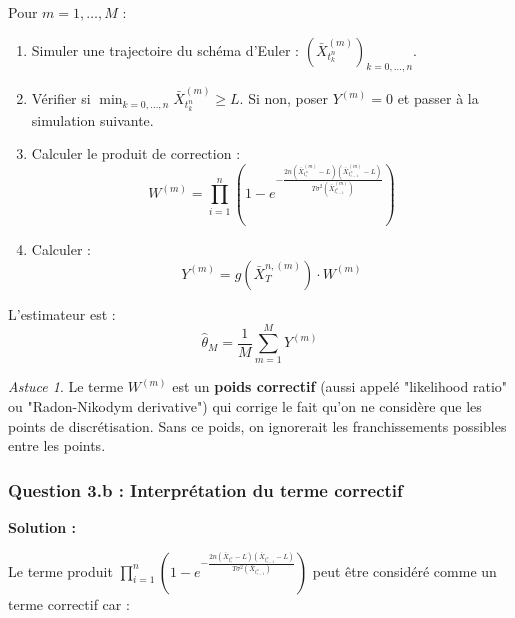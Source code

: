 \documentclass[12pt,a4paper]{article}
\theoremstyle{definition}
\theoremstyle{remark}
\newtheorem*{astuce}{Astuce}
\begin{document}
Pour $m = 1, \ldots, M$ :
\begin{enumerate}
\item Simuler une trajectoire du schéma d'Euler : $(\bar{X}_{t_k^n}^{(m)})_{k=0,\ldots,n}$.

\item Vérifier si $\min_{k=0,\ldots,n} \bar{X}_{t_k^n}^{(m)} \geq L$. Si non, poser $Y^{(m)} = 0$ et passer à la simulation suivante.

\item Calculer le produit de correction :
\[
W^{(m)} = \prod_{i=1}^n \left(1 - e^{-\frac{2n(\bar{X}_{t_i^n}^{(m)}-L)(\bar{X}_{t_{i-1}^n}^{(m)}-L)}{T\sigma^2(\bar{X}_{t_{i-1}^n}^{(m)})}}\right)
\]

\item Calculer :
\[
Y^{(m)} = g(\bar{X}_T^{n,(m)}) \cdot W^{(m)}
\]
\end{enumerate}

L'estimateur est :
\[
\hat{\theta}_M = \frac{1}{M}\sum_{m=1}^M Y^{(m)}
\]

\begin{astuce}
Le terme $W^{(m)}$ est un \textbf{poids correctif} (aussi appelé "likelihood ratio" ou "Radon-Nikodym derivative") qui corrige le fait qu'on ne considère que les points de discrétisation. Sans ce poids, on ignorerait les franchissements possibles entre les points.
\end{astuce}

\subsubsection{Question 3.b : Interprétation du terme correctif}

\textbf{Solution :}

Le terme produit $\prod_{i=1}^n \left(1 - e^{-\frac{2n(\bar{X}_{t_i^n}-L)(\bar{X}_{t_{i-1}^n}-L)}{T\sigma^2(\bar{X}_{t_{i-1}^n})}}\right)$ peut être considéré comme un terme correctif car :
\end{document}

